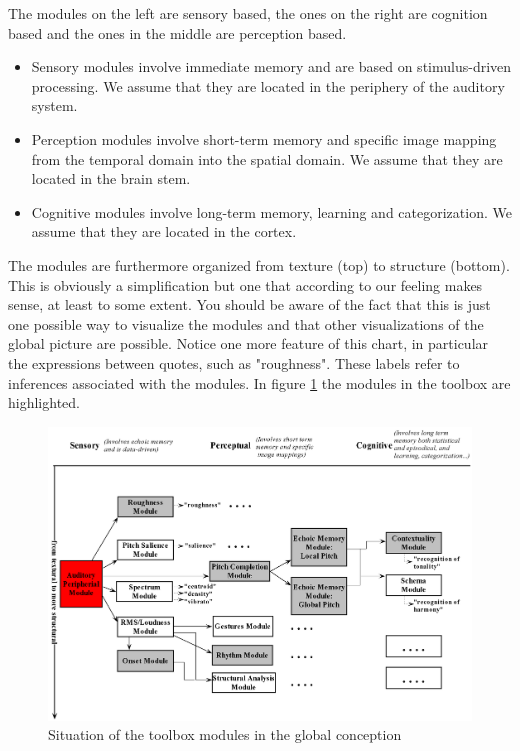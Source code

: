 The modules on the left are sensory based, the ones on the right
are cognition based and the ones in the middle are perception
based.
\begin{itemize}
    \item Sensory modules involve immediate memory and are based
    on stimulus-driven processing. We assume that they are located
    in the periphery of the auditory system.
    \item Perception modules involve short-term memory and
    specific image mapping from the temporal domain into the
    spatial domain. We assume that they are located in the brain
    stem.
    \item Cognitive modules involve long-term memory, learning and
    categorization. We assume that they are located in the cortex.
\end{itemize}
The modules are furthermore organized from texture (top) to
structure (bottom). This is obviously a simplification but one
that according to our feeling makes sense, at least to some
extent. You should be aware of the fact that this is just one
possible way to visualize the modules and that other
visualizations of the global picture are possible. Notice one more
feature of this chart, in particular the expressions between
quotes, such as "roughness". These labels refer to inferences
associated with the modules. In figure
\ref{Fig:ModulesHighlighted} the modules in the toolbox are
highlighted.

\begin{figure}[h]
    \centering
    \includegraphics[width=\textwidth]{Graphics/ModulesHighlighted}
    \caption{Situation of the toolbox modules in the global conception}
    \label{Fig:ModulesHighlighted}
\end{figure}

